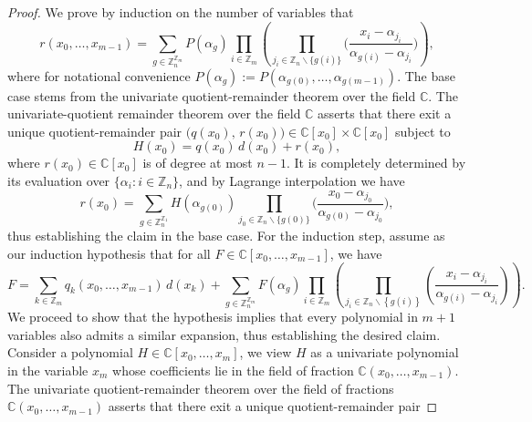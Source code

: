 \begin{proof}
We prove by induction on the number of variables that
\begin{equation}
r(x_{0},\ldots,x_{m-1})=\sum_{g\in\mathbb{Z}_{n}^{\mathbb{Z}_{m}}}P(\alpha_{g})\prod_{i\in\mathbb{Z}_{m}}\left(\prod_{j_{i}\in\mathbb{Z}_{n}\backslash\{g(i)\}}\bigg(\frac{x_{i}-\alpha_{j_{i}}}{\alpha_{g(i)}-\alpha_{j_{i}}}\bigg)\right),
\end{equation}
where for notational convenience $P(\alpha_{g}):=P(\alpha_{g(0)},\ldots,\alpha_{g(m-1)})$.
The base case stems from the univariate quotient-remainder theorem over the field $\mathbb{C}$. The univariate-quotient remainder theorem over the field $\mathbb{C}$ asserts that there exit
a unique quotient-remainder pair $\big(q(x_{0}),\,r(x_{0})\big)\in\mathbb{C}[x_{0}]\times\mathbb{C}[x_{0}]$
subject to
\begin{equation}
H(x_{0})=q(x_{0})\,d(x_{0})+r(x_{0}),
\end{equation}
where $r(x_{0})\in\mathbb{C}[x_{0}]$ is of degree at most $n-1$.
It is completely determined by its evaluation over $\{\alpha_{i}:i\in\mathbb{Z}_{n}\}$,
and by Lagrange interpolation we have 
\begin{equation}
r(x_{0})=\sum_{g\in\mathbb{Z}_{n}^{\mathbb{Z}_{1}}}H(\alpha_{g(0)})\prod_{j_{0}\in\mathbb{Z}_{n}\backslash\{g(0)\}}\bigg(\frac{x_{0}-\alpha_{j_{0}}}{\alpha_{g(0)}-\alpha_{j_{0}}}\bigg),
\end{equation}
thus establishing the claim in the base case. For the induction step,
assume as our induction hypothesis that for all $F\in\mathbb{C}\left[x_{0},\ldots,x_{m-1}\right]$,
we have
\begin{equation}
F=\sum_{k\in\mathbb{Z}_{m}}q_{k}(x_{0},\ldots,x_{m-1})\,d(x_{k})+\sum_{g\in\mathbb{Z}_{n}^{\mathbb{Z}_{m}}}F(\alpha_{g})\prod_{i\in\mathbb{Z}_{m}}\left(\prod_{j_{i}\in\mathbb{Z}_{n}\backslash\left\{ g(i)\right\} }\left(\frac{x_{i}-\alpha_{j_{i}}}{\alpha_{g(i)}-\alpha_{j_{i}}}\right)\right).
\end{equation}
We proceed to show that the hypothesis implies that every polynomial in
$m+1$ variables also admits a similar expansion, thus establishing
the desired claim. Consider a polynomial $H \in \mathbb{C}[x_{0},\ldots,x_{m}]$, we view $H$ as a univariate polynomial in the variable $x_{m}$ whose coefficients lie in the field of fraction $\mathbb{C}(x_{0},\ldots,x_{m-1})$.
The univariate quotient-remainder theorem over the field of fractions $\mathbb{C}(x_{0},\ldots,x_{m-1})$ asserts that
there exit a unique quotient-remainder pair

\end{proof}
